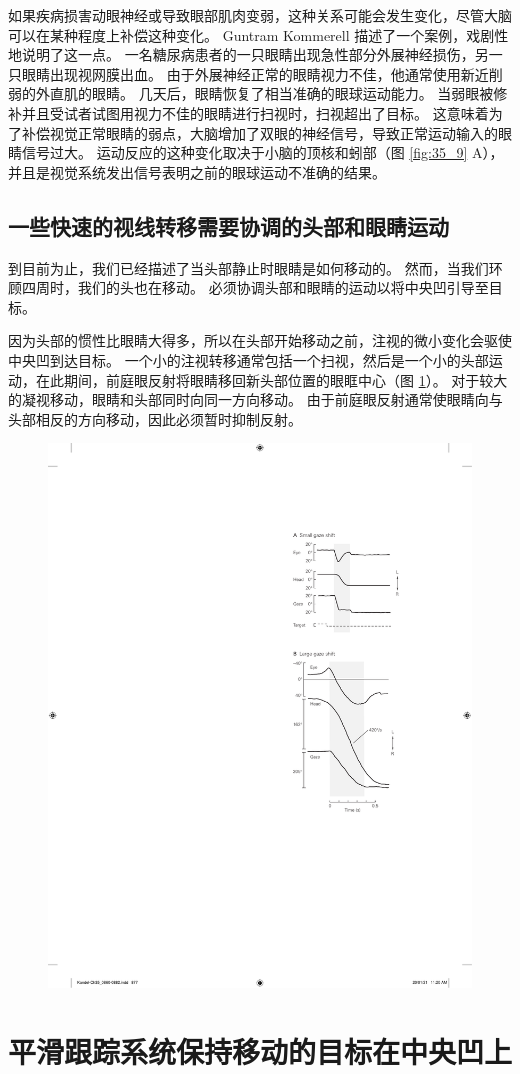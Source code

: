 如果疾病损害动眼神经或导致眼部肌肉变弱，这种关系可能会发生变化，尽管大脑可以在某种程度上补偿这种变化。
Guntram Kommerell 描述了一个案例，戏剧性地说明了这一点。
一名糖尿病患者的一只眼睛出现急性部分外展神经损伤，另一只眼睛出现视网膜出血。
由于外展神经正常的眼睛视力不佳，他通常使用新近削弱的外直肌的眼睛。
几天后，眼睛恢复了相当准确的眼球运动能力。
当弱眼被修补并且受试者试图用视力不佳的眼睛进行扫视时，扫视超出了目标。
这意味着为了补偿视觉正常眼睛的弱点，大脑增加了双眼的神经信号，导致正常运动输入的眼睛信号过大。
运动反应的这种变化取决于小脑的顶核和蚓部（图 \ref{fig:35_9} A），并且是视觉系统发出信号表明之前的眼球运动不准确的结果。


\subsection{一些快速的视线转移需要协调的头部和眼睛运动}

到目前为止，我们已经描述了当头部静止时眼睛是如何移动的。
然而，当我们环顾四周时，我们的头也在移动。
必须协调头部和眼睛的运动以将中央凹引导至目标。


因为头部的惯性比眼睛大得多，所以在头部开始移动之前，注视的微小变化会驱使中央凹到达目标。
一个小的注视转移通常包括一个扫视，然后是一个小的头部运动，在此期间，前庭眼反射将眼睛移回新头部位置的眼眶中心（图 \ref{fig:35_14}）。
对于较大的凝视移动，眼睛和头部同时向同一方向移动。
由于前庭眼反射通常使眼睛向与头部相反的方向移动，因此必须暂时抑制反射。


\begin{figure}[htbp]
	\centering
	\includegraphics[width=0.4\linewidth]{chap35/fig_35_14}
	\caption{}
	\label{fig:35_14}
\end{figure}


\section{平滑跟踪系统保持移动的目标在中央凹上}

